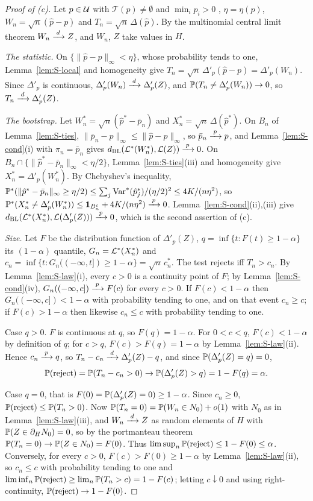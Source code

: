 \begin{proof}[Proof of (c)]
Let $p\in\mathcal{U}$ with $\mathcal T(p)\ne\emptyset$ and $\min_ip_i>0$ , $\eta=\eta(p)$, $W_n=\sqrt n(\hat p-p)$ and $T_n=\sqrt n\,\Delta(\hat p)$. By the multinomial central limit theorem $W_n\xrightarrow{\;d\;} Z$, and $W_n$, $Z$ take values in $H$.

\emph{The statistic.} On $\{\|\hat p-p\|_\infty<\eta\}$, whose probability tends to one, Lemma~\ref{lem:S-local} and homogeneity give $T_n=\sqrt n\,\Delta'_p(\hat p-p)=\Delta'_p(W_n)$. Since $\Delta'_p$ is continuous, $\Delta'_p(W_n)\xrightarrow{\;d\;}\Delta'_p(Z)$, and $\mathbb{P}(T_n\ne\Delta'_p(W_n))\to0$, so $T_n\xrightarrow{\;d\;}\Delta'_p(Z)$.

\emph{The bootstrap.} Let $W^\ast_n=\sqrt n(\hat p^\ast-\bar p_n)$ and $X^\ast_n=\sqrt n\,\Delta(\hat p^\ast)$. On $B_n$ of Lemma~\ref{lem:S-ties}, $\|\bar p_n-p\|_\infty\le\|\hat p-p\|_\infty$, so $\bar p_n\xrightarrow{\;p\;} p$, and Lemma~\ref{lem:S-cond}(i) with $\pi_n=\bar p_n$ gives $d_{\mathrm{BL}}(\mathcal{L}^\ast(W^\ast_n),\mathcal{L}(Z))\xrightarrow{\;p\;}0$. On $B_n\cap\{\|\hat p^\ast-\bar p_n\|_\infty<\eta/2\}$, Lemma~\ref{lem:S-ties}(iii) and homogeneity give $X^\ast_n=\Delta'_p(W^\ast_n)$. By Chebyshev's inequality, $\mathbb{P}^\ast(\|\hat p^\ast-\bar p_n\|_\infty\ge\eta/2)\le\sum_j\mathrm{Var}^\ast(\hat p^\ast_j)/(\eta/2)^2\le4K/(n\eta^2)$, so $\mathbb{P}^\ast(X^\ast_n\ne\Delta'_p(W^\ast_n))\le\mathbf{1}_{B_n^c}+4K/(n\eta^2)\xrightarrow{\;p\;}0$. Lemma~\ref{lem:S-cond}(ii),(iii) give $d_{\mathrm{BL}}(\mathcal{L}^\ast(X^\ast_n),\mathcal{L}(\Delta'_p(Z)))\xrightarrow{\;p\;}0$, which is the second assertion of (c).

\emph{Size.} Let $F$ be the distribution function of $\Delta'_p(Z)$, $q=\inf\{t:F(t)\ge1-\alpha\}$ its $(1-\alpha)$ quantile, $G_n=\mathcal{L}^\ast(X^\ast_n)$ and $c_n=\inf\{t:G_n((-\infty,t])\ge1-\alpha\}=\sqrt n\,c^\ast_n$. The test rejects iff $T_n>c_n$. By Lemma~\ref{lem:S-law}(i), every $c>0$ is a continuity point of $F$; by Lemma~\ref{lem:S-cond}(iv), $G_n((-\infty,c])\xrightarrow{\;p\;} F(c)$ for every $c>0$. If $F(c)<1-\alpha$ then $G_n((-\infty,c])<1-\alpha$ with probability tending to one, and on that event $c_n\ge c$; if $F(c)>1-\alpha$ then likewise $c_n\le c$ with probability tending to one.

Case $q>0$. $F$ is continuous at $q$, so $F(q)=1-\alpha$. For $0<c<q$, $F(c)<1-\alpha$ by definition of $q$; for $c>q$, $F(c)>F(q)=1-\alpha$ by Lemma~\ref{lem:S-law}(ii). Hence $c_n\xrightarrow{\;p\;} q$, so $T_n-c_n\xrightarrow{\;d\;}\Delta'_p(Z)-q$, and since $\mathbb{P}(\Delta'_p(Z)=q)=0$,
\[
\mathbb{P}(\text{reject})=\mathbb{P}(T_n-c_n>0)\to\mathbb{P}(\Delta'_p(Z)>q)=1-F(q)=\alpha .
\]

Case $q=0$, that is $F(0)=\mathbb{P}(\Delta'_p(Z)=0)\ge1-\alpha$. Since $c_n\ge0$, $\mathbb{P}(\text{reject})\le\mathbb{P}(T_n>0)$. Now $\mathbb{P}(T_n=0)=\mathbb{P}(W_n\in N_0)+o(1)$ with $N_0$ as in Lemma~\ref{lem:S-law}(iii), and $W_n\xrightarrow{\;d\;} Z$ as random elements of $H$ with $\mathbb{P}(Z\in\partial_HN_0)=0$, so by the portmanteau theorem $\mathbb{P}(T_n=0)\to\mathbb{P}(Z\in N_0)=F(0)$. Thus $\limsup_n\mathbb{P}(\text{reject})\le1-F(0)\le\alpha$. Conversely, for every $c>0$, $F(c)>F(0)\ge1-\alpha$ by Lemma~\ref{lem:S-law}(ii), so $c_n\le c$ with probability tending to one and $\liminf_n\mathbb{P}(\text{reject})\ge\lim_n\mathbb{P}(T_n>c)=1-F(c)$; letting $c\downarrow0$ and using right-continuity, $\mathbb{P}(\text{reject})\to1-F(0)$.


\end{proof}
